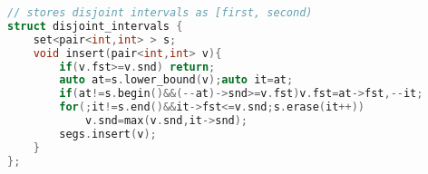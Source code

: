 \begin{lstlisting}[language=C++]
// stores disjoint intervals as [first, second)
struct disjoint_intervals {
	set<pair<int,int> > s;
	void insert(pair<int,int> v){
		if(v.fst>=v.snd) return;
		auto at=s.lower_bound(v);auto it=at;
		if(at!=s.begin()&&(--at)->snd>=v.fst)v.fst=at->fst,--it;
		for(;it!=s.end()&&it->fst<=v.snd;s.erase(it++))
			v.snd=max(v.snd,it->snd);
		segs.insert(v);
	}
};
\end{lstlisting}